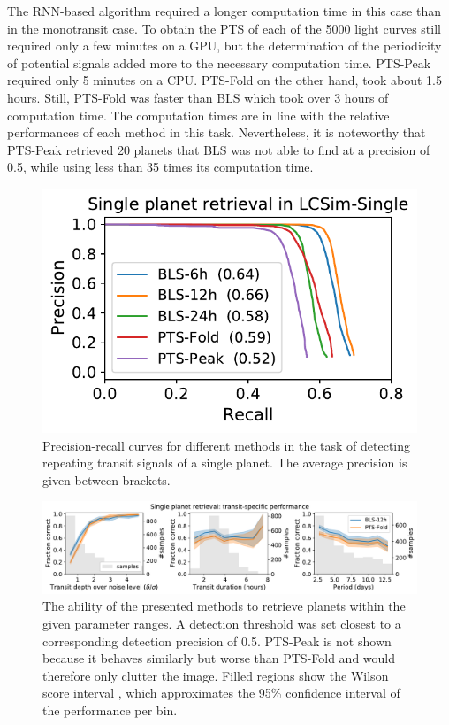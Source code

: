 The RNN-based algorithm required a longer computation time in this case than in the monotransit case. To obtain the PTS of each of the 5000 light curves still required only a few minutes on a GPU, but the determination of the periodicity of potential signals added more to the necessary computation time. PTS-Peak required only 5 minutes on a CPU. PTS-Fold on the other hand, took about 1.5 hours. Still, PTS-Fold was faster than BLS which took over 3 hours of computation time. The computation times are in line with the relative performances of each method in this task. Nevertheless, it is noteworthy that PTS-Peak retrieved 20 planets that BLS was not able to find at a precision of 0.5, while using less than 35 times its computation time.


\begin{figure}
    \centering
    \includegraphics[width=0.35\linewidth]{Experiments/Figures/Singles/single_pr.pdf}
    \caption{Precision-recall curves for different methods in the task of detecting repeating transit signals of a single planet. The average precision is given between brackets.}
    \label{fig:single_pr}
\end{figure}


\begin{figure}
    \centering
    \includegraphics[width=\linewidth]{Experiments/Figures/Singles/single_transit_specific.pdf}
    \caption{The ability of the presented methods to retrieve planets within the given parameter ranges. A detection threshold was set closest to a corresponding detection precision of 0.5. PTS-Peak is not shown because it behaves similarly but worse than PTS-Fold and would therefore only clutter the image. Filled regions show the Wilson score interval \citep{wilson1927probable}, which approximates the 95\% confidence interval of the performance per bin.}
    \label{fig:single_transit}
\end{figure}



